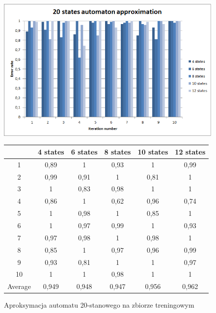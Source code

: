 \documentclass[runningheads,a4paper]{llncs}
\begin{document}
\begin{figure}[!htb]
\includegraphics[scale=0.92]{7.png}
\endminipage\hfill
\hspace{2.2cm}
\renewcommand{\arraystretch}{1.3}%
\begin{tabular}{@{}cccccc@{}}
\toprule
        & 4 states & 6 states & 8 states & 10 states & 12 states    \\ \midrule
1       & 0,89     & 1        & 0,93     & 1         & 0,99 \\
2       & 0,99     & 0,91     & 1        & 0,81      & 1 \\
3       & 1        & 0,83     & 0,98     & 1         & 1 \\
4       & 0,86     & 1        & 0,62     & 0,96      & 0,74   \\
5       & 1        & 0,98     & 1        & 0,85      & 1   \\
6       & 1        & 0,97     & 0,99     & 1         & 0,93    \\
7       & 0,97     & 0,98     & 1        & 0,98      & 1    \\
8       & 0,85     & 1        & 0,97     & 0,96      & 0,99     \\
9       & 0,93     & 0,81     & 1        & 1         & 0,97 \\
10      & 1        & 1        & 0,98     & 1         & 1  \\ \bottomrule
Average & 0,949    & 0,948    & 0,947    & 0,956     & 0,962  \\ \bottomrule
\end{tabular}
\vspace{4mm}
\endminipage\hfill
\caption{Aproksymacja automatu 20-stanowego na zbiorze treningowym}
\end{figure}
\end{document}
